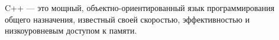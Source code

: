 C++ — это мощный, объектно-ориентированный язык программирования общего назначения, известный своей скоростью, эффективностью и низкоуровневым доступом к памяти\cite{HABR_WHY_CPP}.